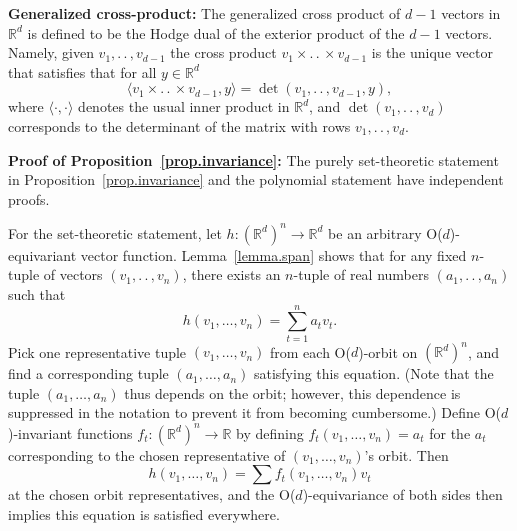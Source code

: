 \documentclass{article}
\renewcommand{\paragraph}[1]{\par\textbf{#1}}
\theoremstyle{Hogg}
\newcommand{\inner}[2]{\langle{#1},{#2}\rangle}
\renewcommand{\ldots}{.\,.\,}
\begin{document}
\paragraph{Generalized cross-product:}
The generalized cross product of $d-1$ vectors in $\mathbb R^d$ is defined to be the Hodge dual of the exterior product of the $d-1$ vectors. Namely, given $v_1,\ldots, v_{d-1}$ the cross product $v_1\times \ldots \times v_{d-1}$ is the unique vector that satisfies that for all $y\in \mathbb R^d$ 
\begin{equation}
    \inner{v_1\times \ldots \times v_{d-1}}{y} = \operatorname{det}(v_1,\ldots, v_{d-1},y),
\end{equation}
where $\inner{\cdot}{\cdot}$ denotes the usual inner product in $\mathbb R^d$, and $\operatorname{det}(v_1,\ldots,v_d)$ corresponds to the determinant of the matrix with rows $v_1,\ldots,v_d$. 

\paragraph{Proof of 
Proposition~\ref{prop.invariance}:}
The purely set-theoretic statement in Proposition~\ref{prop.invariance} and the polynomial statement have independent proofs. 

For the set-theoretic statement, let $h:(\mathbb R^d)^n \rightarrow \mathbb R^d$ be an arbitrary O($d$)-equivariant vector function. Lemma~\ref{lemma.span} shows that for any fixed $n$-tuple of vectors $(v_1,\ldots,v_n)$, there exists an $n$-tuple of real numbers $(a_1,\ldots,a_n)$ such that
\begin{equation}
h(v_1,\dots,v_n) = \sum_{t=1}^n a_tv_t.
\end{equation}
Pick one representative tuple $(v_1,\dots,v_n)$ from each O($d$)-orbit on $(\mathbb R^d)^n$, and find a corresponding tuple $(a_1,\dots,a_n)$ satisfying this equation. (Note that the tuple $(a_1,\dots,a_n)$ thus depends on the orbit; however, this dependence is suppressed in the notation to prevent it from becoming cumbersome.) Define O($d$)-invariant functions $f_t:(\mathbb R^d)^n \rightarrow \mathbb R$ by defining $f_t(v_1,\dots,v_n) = a_t$ for the $a_t$ corresponding to the chosen representative of $(v_1,\dots,v_n)$'s orbit. Then
\begin{equation}
h(v_1,\dots,v_n) = \sum f_t(v_1,\dots,v_n) v_t
\end{equation}
at the chosen orbit representatives, and the O($d$)-equivariance of both sides then implies this equation is satisfied everywhere.
\end{document}
